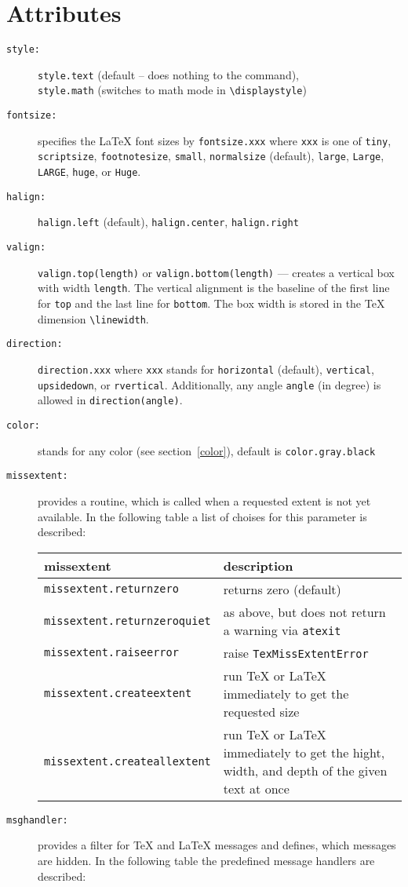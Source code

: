 \section{Attributes}
\begin{description}
\item[\texttt{style:}] \verb|style.text| (default -- does nothing to
the command),\\\verb|style.math| (switches to math mode in
\verb|\displaystyle|)
\item[\texttt{fontsize:}] specifies the \LaTeX{} font sizes by
\verb|fontsize.xxx| where \verb|xxx| is one of
\verb|tiny|,
\verb|scriptsize|,
\verb|footnotesize|,
\verb|small|,
\verb|normalsize| (default),
\verb|large|,
\verb|Large|,
\verb|LARGE|,
\verb|huge|, or
\verb|Huge|.
\item[\texttt{halign:}] \verb|halign.left| (default),
\verb|halign.center|, \verb|halign.right|
\item[\texttt{valign:}] \verb|valign.top(length)| or
\verb|valign.bottom(length)| --- creates a vertical box with width
\verb|length|. The vertical alignment is the baseline of the first line
for \verb|top| and the last line for \verb|bottom|. The box width is
stored in the \TeX{} dimension \verb|\linewidth|.
\item[\texttt{direction:}] \verb|direction.xxx| where \verb|xxx|
stands for \verb|horizontal| (default), \verb|vertical|,
\verb|upsidedown|, or \verb|rvertical|. Additionally, any angle
\verb|angle| (in degree) is allowed in \verb|direction(angle)|.
\item[\texttt{color:}] stands for any \PyX{} color (see
section~\ref{color}), default is \verb|color.gray.black|
\item[\texttt{missextent:}] provides a routine, which is called when a
requested extent is not yet available. In the following table a list
of choises for this parameter is described:

\begin{tabularx}{\linewidth}{l>{\raggedright\arraybackslash}X}
missextent&description\\
\hline
\texttt{missextent.returnzero}&returns zero (default)\\
\texttt{missextent.returnzeroquiet}&as above, but does not return a
warning via \texttt{atexit}\\
\texttt{missextent.raiseerror}&raise \texttt{TexMissExtentError}\\
\texttt{missextent.createextent}&run \TeX{} or \LaTeX{} immediately to
get the requested size\\
\texttt{missextent.createallextent}&run \TeX{} or \LaTeX{} immediately
to get the hight, width, and depth of the given text at once\\
\end{tabularx}
\item[\texttt{msghandler:}] provides a filter for \TeX{} and \LaTeX{}
messages and defines, which messages are hidden. In the following table
the predefined message handlers are described:


\end{description}
